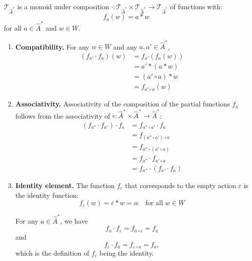 \begin{propositionE}
    \label{prp:T_is_monoid}
    $\mathcal{T}_{\hat{A}^{*}}$ is a monoid under composition $\cdot: \mathcal{T}_{\hat{A}^{*}} \times \mathcal{T}_{\hat{A}^{*}} \to \mathcal{T}_{\hat{A}^{*}}$ of functions with:
    \begin{equation}
        f_{a}(w) = a \ast w
    \end{equation}
    for all $a \in \hat{A}^{*}$ and $w \in W$.
\end{propositionE}
\begin{proofE}
\begin{enumerate}
    \item \textbf{Compatibility.}
    For any $w \in W$ and any $a, a' \in \hat{A}^{*}$,
    \begin{align}
        (f_{a'} \cdot f_{a})(w) & = f_{a'} (f_{a}(w)) \\
        & = a' \ast (a \ast w) \\
        & = (a' \circ a) \ast w \\
        & = f_{a' \circ a}(w)
    \end{align}

    \item \textbf{Associativity.}
    Associativity of the composition of the partial functions $f_{a}$ follows from the associativity of $\circ: \hat{A}^{*} \times \hat{A}^{*} \to \hat{A}^{*}$:
    \begin{align}
      (f_{a''} \cdot f_{a'}) \cdot f_{a} & = f_{a'' \circ a'} \cdot f_{a}       \\
                                         & = f_{(a'' \circ a') \circ a}         \\
                                         & = f_{a'' \circ (a' \circ a)}         \\
                                         & = f_{a''} \cdot f_{a' \circ a}       \\
                                         & = f_{a''} \cdot (f_{a'} \cdot f_{a})
    \end{align}
    \item \textbf{Identity element.}
    The function $f_{\varepsilon}$ that corresponds to the empty action $\varepsilon$ is the identity function:
    \begin{equation}
      f_{\varepsilon}(w) = \varepsilon \ast w = w \quad \text{for all $w \in W$}
    \end{equation}

    For any $a \in \hat{A}^{*}$, we have
    \begin{equation}
        f_{a} \cdot f_{\varepsilon} = f_{a \circ \varepsilon} = f_{a}
    \end{equation}
    and
    \begin{equation}
        f_{\varepsilon} \cdot f_{a} = f_{\varepsilon \circ a} = f_{a},
    \end{equation}
    which is the definition of $f_{\varepsilon}$ being the identity.
\end{enumerate}
\end{proofE}

